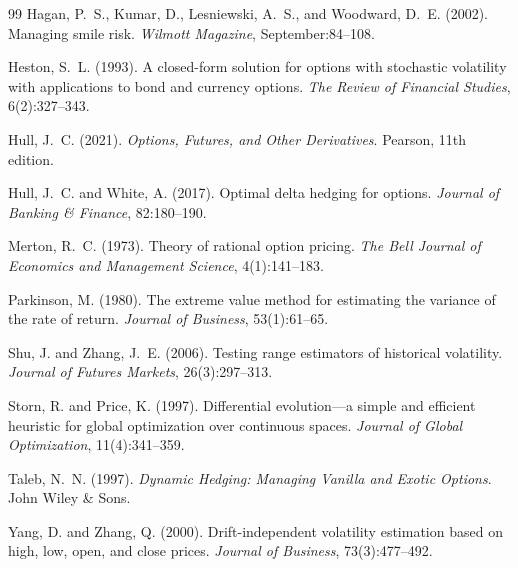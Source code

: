 \documentclass[12pt, letterpaper]{article}
\begin{document}
\begin{thebibliography}{99}
Hagan, P.~S., Kumar, D., Lesniewski, A.~S., and Woodward, D.~E. (2002).
\newblock Managing smile risk.
\newblock \textit{Wilmott Magazine}, September:84--108.

Heston, S.~L. (1993).
\newblock A closed-form solution for options with stochastic volatility with applications to bond and currency options.
\newblock \textit{The Review of Financial Studies}, 6(2):327--343.

Hull, J.~C. (2021).
\newblock \textit{Options, Futures, and Other Derivatives}.
\newblock Pearson, 11th edition.

Hull, J.~C. and White, A. (2017).
\newblock Optimal delta hedging for options.
\newblock \textit{Journal of Banking \& Finance}, 82:180--190.

Merton, R.~C. (1973).
\newblock Theory of rational option pricing.
\newblock \textit{The Bell Journal of Economics and Management Science}, 4(1):141--183.

Parkinson, M. (1980).
\newblock The extreme value method for estimating the variance of the rate of return.
\newblock \textit{Journal of Business}, 53(1):61--65.

Shu, J. and Zhang, J.~E. (2006).
\newblock Testing range estimators of historical volatility.
\newblock \textit{Journal of Futures Markets}, 26(3):297--313.

Storn, R. and Price, K. (1997).
\newblock Differential evolution---a simple and efficient heuristic for global optimization over continuous spaces.
\newblock \textit{Journal of Global Optimization}, 11(4):341--359.

Taleb, N.~N. (1997).
\newblock \textit{Dynamic Hedging: Managing Vanilla and Exotic Options}.
\newblock John Wiley \& Sons.

Yang, D. and Zhang, Q. (2000).
\newblock Drift-independent volatility estimation based on high, low, open, and close prices.
\newblock \textit{Journal of Business}, 73(3):477--492.

\end{thebibliography}
\end{document}

